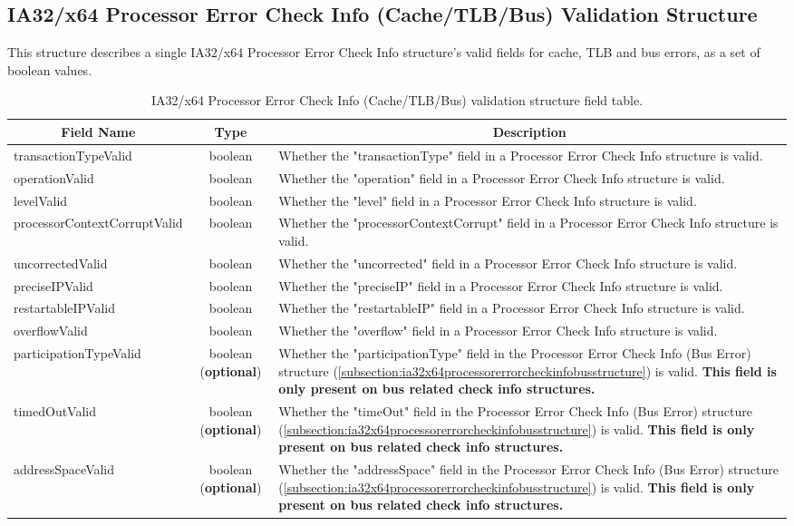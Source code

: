 \documentclass{report}
\newcommand*{\thead}[1]{\multicolumn{1}{|c|}{\bfseries #1}}
\newcommand*{\jsontable}[1]{
    \begin{table}[!ht]
    \label{#1}
    \centering
    \begin{adjustbox}{center}
    \begin{tabular}{|l|c|p{8cm}|}
    \hline
    \thead{Field Name} & \thead{Type} & \thead{Description} \\
    \hline
}
\newcommand*{\jsontableend}[1]{
    \hline
    \end{tabular}
    \end{adjustbox}
    \caption{#1}
    \label{table:#1}
    \end{table}
    \FloatBarrier
}
\begin{document}
\subsection{IA32/x64 Processor Error Check Info (Cache/TLB/Bus) Validation Structure}
\label{subsection:ia32x64processorerrorcheckinfovalidationstructure}
This structure describes a single IA32/x64 Processor Error Check Info structure's valid fields for cache, TLB and bus errors, as a set of boolean values.
\jsontable{table:ia32x64processorerrorcheckinfovalidationstructure}
transactionTypeValid & boolean & Whether the "transactionType" field in a Processor Error Check Info structure is valid.\\
\hline
operationValid & boolean & Whether the "operation" field in a Processor Error Check Info structure is valid.\\
\hline
levelValid & boolean & Whether the "level" field in a Processor Error Check Info structure is valid.\\
\hline
processorContextCorruptValid & boolean & Whether the "processorContextCorrupt" field in a Processor Error Check Info structure is valid.\\
\hline
uncorrectedValid & boolean & Whether the "uncorrected" field in a Processor Error Check Info structure is valid.\\
\hline
preciseIPValid & boolean & Whether the "preciseIP" field in a Processor Error Check Info structure is valid.\\
\hline
restartableIPValid & boolean & Whether the "restartableIP" field in a Processor Error Check Info structure is valid.\\
\hline
overflowValid & boolean & Whether the "overflow" field in a Processor Error Check Info structure is valid.\\
\hline
participationTypeValid & boolean (\textbf{optional}) & Whether the "participationType" field in the Processor Error Check Info (Bus Error) structure (\ref{subsection:ia32x64processorerrorcheckinfobusstructure}) is valid. \textbf{This field is only present on bus related check info structures.}\\
\hline
timedOutValid & boolean (\textbf{optional}) & Whether the "timeOut" field in the Processor Error Check Info (Bus Error) structure (\ref{subsection:ia32x64processorerrorcheckinfobusstructure}) is valid. \textbf{This field is only present on bus related check info structures.}\\
\hline
addressSpaceValid & boolean (\textbf{optional}) & Whether the "addressSpace" field in the Processor Error Check Info (Bus Error) structure (\ref{subsection:ia32x64processorerrorcheckinfobusstructure}) is valid. \textbf{This field is only present on bus related check info structures.}\\
\jsontableend{IA32/x64 Processor Error Check Info (Cache/TLB/Bus) validation structure field table.}
\end{document}
